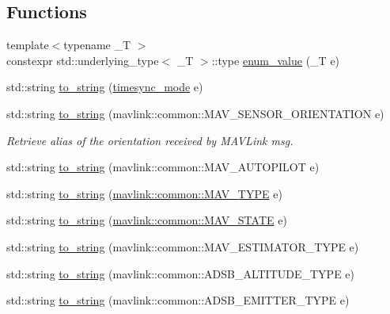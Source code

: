 \subsection*{Functions}
\begin{DoxyCompactItemize}
\item 
{\footnotesize template$<$typename \+\_\+T $>$ }\\constexpr std\+::underlying\+\_\+type$<$ \+\_\+T $>$\+::type \mbox{\hyperlink{group__mavutils_gaed9174e090ae0f75aeb9096b7cb6be56}{enum\+\_\+value}} (\+\_\+T e)
\item 
std\+::string \mbox{\hyperlink{group__mavutils_gac86aed43baa119369cb7eb523c7de067}{to\+\_\+string}} (\mbox{\hyperlink{group__mavutils_gac7f53712a7627f397d0eb145c2a16cf7}{timesync\+\_\+mode}} e)
\item 
std\+::string \mbox{\hyperlink{group__mavutils_ga014455201c2903b835912e056c64d02f}{to\+\_\+string}} (mavlink\+::common\+::\+M\+A\+V\+\_\+\+S\+E\+N\+S\+O\+R\+\_\+\+O\+R\+I\+E\+N\+T\+A\+T\+I\+ON e)
\begin{DoxyCompactList}\small\item\em Retrieve alias of the orientation received by M\+A\+V\+Link msg. \end{DoxyCompactList}\item 
std\+::string \mbox{\hyperlink{group__mavutils_gaf790b7f7da119e86e0875c9def1f45aa}{to\+\_\+string}} (mavlink\+::common\+::\+M\+A\+V\+\_\+\+A\+U\+T\+O\+P\+I\+L\+OT e)
\item 
std\+::string \mbox{\hyperlink{group__mavutils_gac2fb656a52c699748f929392f47523bf}{to\+\_\+string}} (\mbox{\hyperlink{include__v0_89_2mavlink__types_8h_aaf404a9fdbd4c9a05d6cab18790dbb28}{mavlink\+::common\+::\+M\+A\+V\+\_\+\+T\+Y\+PE}} e)
\item 
std\+::string \mbox{\hyperlink{group__mavutils_gaafc0054ec09db1d1fd1560da7be6d265}{to\+\_\+string}} (\mbox{\hyperlink{include__v0_89_2mavlink__types_8h_a3ca5e79cdc1f95d953a6d1d7ab1e90bb}{mavlink\+::common\+::\+M\+A\+V\+\_\+\+S\+T\+A\+TE}} e)
\item 
std\+::string \mbox{\hyperlink{group__mavutils_ga3e1f543b99b1e237a90ccdad25bd3bdb}{to\+\_\+string}} (mavlink\+::common\+::\+M\+A\+V\+\_\+\+E\+S\+T\+I\+M\+A\+T\+O\+R\+\_\+\+T\+Y\+PE e)
\item 
std\+::string \mbox{\hyperlink{group__mavutils_ga8e40158252eb7c24a59036afd35bf12b}{to\+\_\+string}} (mavlink\+::common\+::\+A\+D\+S\+B\+\_\+\+A\+L\+T\+I\+T\+U\+D\+E\+\_\+\+T\+Y\+PE e)
\item 
std\+::string \mbox{\hyperlink{group__mavutils_gab8a1c172a6993c1b668f923e58da594f}{to\+\_\+string}} (mavlink\+::common\+::\+A\+D\+S\+B\+\_\+\+E\+M\+I\+T\+T\+E\+R\+\_\+\+T\+Y\+PE e)

\end{DoxyCompactItemize}
